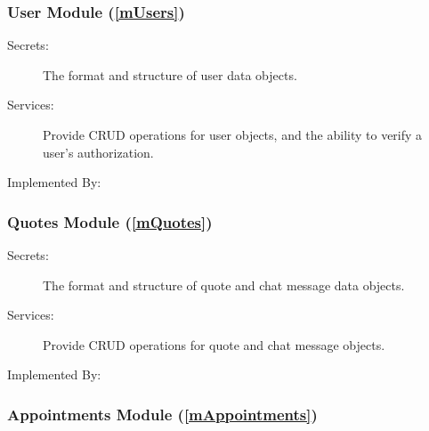 \documentclass[12pt, titlepage]{article}
\begin{document}


\subsubsection{User Module (\ref{mUsers})}

\begin{description}
	\item[Secrets:] The format and structure of user data objects.
	\item[Services:] Provide CRUD operations for user objects, and the ability to verify a user's
		authorization.
	\item[Implemented By:] \progname{}
\end{description}

\subsubsection{Quotes Module (\ref{mQuotes})}

\begin{description}
	\item[Secrets:] The format and structure of quote and chat message data objects.
	\item[Services:] Provide CRUD operations for quote and chat message objects.
	\item[Implemented By:] \progname{}
\end{description}

\subsubsection{Appointments Module (\ref{mAppointments})}
\end{document}
